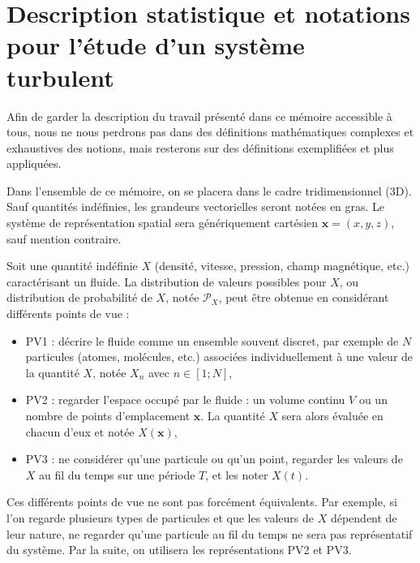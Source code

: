 \section{Description statistique et notations pour l'étude d'un système turbulent}\label{sec-012}

Afin de garder la description du travail présenté dans ce mémoire accessible à tous, nous ne nous perdrons pas dans des définitions mathématiques complexes et exhaustives des notions, mais resterons sur des définitions exemplifiées et plus appliquées. 

Dans l'ensemble de ce mémoire, on se placera dans le cadre tridimensionnel (\acs{3D}). Sauf quantités indéfinies, les grandeurs vectorielles seront notées en gras. Le système de représentation spatial sera génériquement cartésien $\mathbf{x} = (x,y,z)$, sauf mention contraire.

Soit une quantité indéfinie $X$ (densité, vitesse, pression, champ magnétique, etc.) caractérisant un fluide. La distribution de valeurs possibles pour $X$, ou distribution de probabilité de $X$, notée $\mathcal{P}_X$, peut être obtenue en considérant différents points de vue :
\begin{itemize}
    \item PV1 : décrire le fluide comme un ensemble souvent discret, par exemple de $N$ particules (atomes, molécules, etc.) associées individuellement à une valeur de la quantité $X$, notée $X_n$ avec $n \in [1;N]$,
    \item PV2 : regarder l'espace occupé par le fluide : un volume continu $V$ ou un nombre de points d'emplacement $\mathbf{x}$. La quantité $X$ sera alors évaluée en chacun d'eux et notée $X(\mathbf{x})$, 
    \item PV3 : ne considérer qu'une particule ou qu'un point, regarder les valeurs de $X$ au fil du temps sur une période $T$, et les noter $X(t)$. 
\end{itemize}
Ces différents points de vue ne sont pas forcément équivalents. Par exemple, si l'on regarde plusieurs types de particules et que les valeurs de $X$ dépendent de leur nature, ne regarder qu'une particule au fil du temps ne sera pas représentatif du système. Par la suite, on utilisera les représentations PV2 et PV3.  

